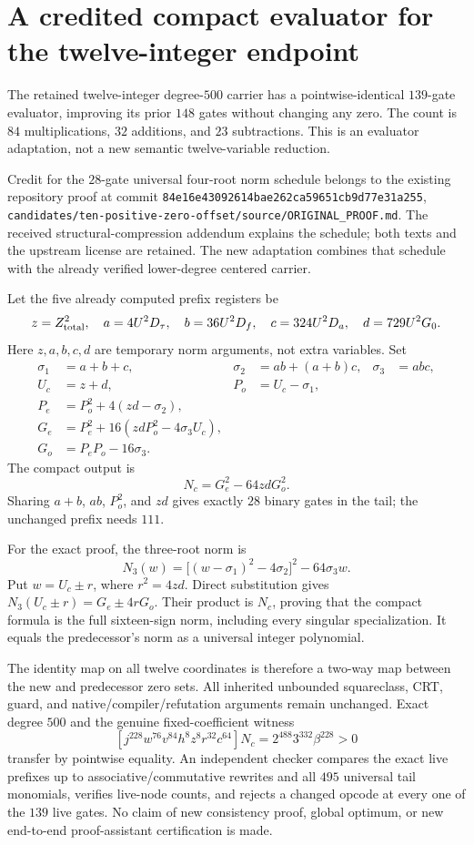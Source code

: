 \section{A credited compact evaluator for the twelve-integer endpoint}
The retained twelve-integer degree-$500$ carrier has a pointwise-identical
$139$-gate evaluator, improving its prior $148$ gates without changing any zero.
The count is $84$ multiplications, $32$ additions, and $23$ subtractions.
This is an evaluator adaptation, not a new semantic twelve-variable reduction.

Credit for the $28$-gate universal four-root norm schedule belongs to the
existing repository proof at commit
\texttt{84e16e43092614bae262ca59651cb9d77e31a255},
\texttt{candidates/ten-positive-zero-offset/source/ORIGINAL\_PROOF.md}.
The received structural-compression addendum explains the schedule; both
texts and the upstream license are retained. The new adaptation combines
that schedule with the already verified lower-degree centered carrier.

Let the five already computed prefix registers be
\[
 z=Z_{\rm total}^2,\quad a=4U^2D_\tau,\quad b=36U^2D_f,
 \quad c=324U^2D_a,\quad d=729U^2G_0.
\]
Here $z,a,b,c,d$ are temporary norm arguments, not extra variables.
Set
\begin{align*}
 \sigma_1&=a+b+c,&\sigma_2&=ab+(a+b)c,&\sigma_3&=abc,\\
 U_c&=z+d,&P_o&=U_c-\sigma_1,\\
 P_e&=P_o^2+4(zd-\sigma_2),\\
 G_e&=P_e^2+16(zdP_o^2-4\sigma_3U_c),\\
 G_o&=P_eP_o-16\sigma_3.
\end{align*}
The compact output is
\[
 \boxed{N_c=G_e^2-64zdG_o^2.}
\]
Sharing $a+b$, $ab$, $P_o^2$, and $zd$ gives exactly $28$ binary gates
in the tail; the unchanged prefix needs $111$.

For the exact proof, the three-root norm is
\[
 N_3(w)=\big[(w-\sigma_1)^2-4\sigma_2\big]^2-64\sigma_3w.
\]
Put $w=U_c\pm r$, where $r^2=4zd$. Direct substitution gives
$N_3(U_c\pm r)=G_e\pm4rG_o$. Their product is $N_c$, proving
that the compact formula is the full sixteen-sign norm, including every
singular specialization. It equals the predecessor's norm as a universal
integer polynomial.

The identity map on all twelve coordinates is therefore a two-way map
between the new and predecessor zero sets. All inherited unbounded
squareclass, CRT, guard, and native/compiler/refutation arguments remain
unchanged. Exact degree $500$ and the genuine fixed-coefficient witness
\[
 [j^{228}w^{76}v^{84}h^8z^8r^{32}c^{64}]N_c
   =2^{488}3^{332}\beta^{228}>0
\]
transfer by pointwise equality. An independent checker compares the exact
live prefixes up to associative/commutative rewrites and all $495$ universal tail monomials, verifies live-node
counts, and rejects a changed opcode at every one of the $139$ live gates.
No claim of new consistency proof, global optimum, or new end-to-end
proof-assistant certification is made.
